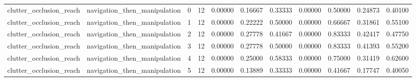 \documentclass{article}
\begin{document}
\begin{table}[tbp]
{\begin{tabular}{lllllllllll}
clutter\_occlusion\_reach & navigation\_then\_manipulation & 0 & 12 & 0.00000 & 0.16667 & 0.33333 & 0.00000 & 0.50000 & 0.24873 & 0.40100 \\
clutter\_occlusion\_reach & navigation\_then\_manipulation & 1 & 12 & 0.00000 & 0.22222 & 0.50000 & 0.00000 & 0.66667 & 0.31861 & 0.55100 \\
clutter\_occlusion\_reach & navigation\_then\_manipulation & 2 & 12 & 0.00000 & 0.27778 & 0.41667 & 0.00000 & 0.83333 & 0.42417 & 0.47750 \\
clutter\_occlusion\_reach & navigation\_then\_manipulation & 3 & 12 & 0.00000 & 0.27778 & 0.50000 & 0.00000 & 0.83333 & 0.41393 & 0.55200 \\
clutter\_occlusion\_reach & navigation\_then\_manipulation & 4 & 12 & 0.00000 & 0.25000 & 0.58333 & 0.00000 & 0.75000 & 0.31419 & 0.62600 \\
clutter\_occlusion\_reach & navigation\_then\_manipulation & 5 & 12 & 0.00000 & 0.13889 & 0.33333 & 0.00000 & 0.41667 & 0.17747 & 0.40050 \\
\bottomrule
\end{tabular}
}
\end{table}

\clearpage
\end{document}
